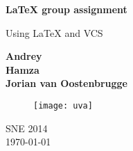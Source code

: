 \begin{titlepage}
    \begin{center}
        \vspace*{4cm}
        
        \LARGE
        \textbf{\LaTeX{} group assignment}
        
        \vspace{0.5cm}
        \large
        Using \LaTeX{} and VCS
        
        \vspace{1.5cm}
        
	\textbf{Andrey}
	\\
	\textbf{Hamza}
	\\
	 \textbf{Jorian van Oostenbrugge}
	
	\vspace{4.5cm}
	
	\begin{figure}[H]
    		\centering
    		\texttt{[image: uva]}
	\end{figure}
        
        \vfill
        
        \vspace{0.8cm}
	SNE 2014
	\\
        \today
        
    \end{center}
\end{titlepage}
